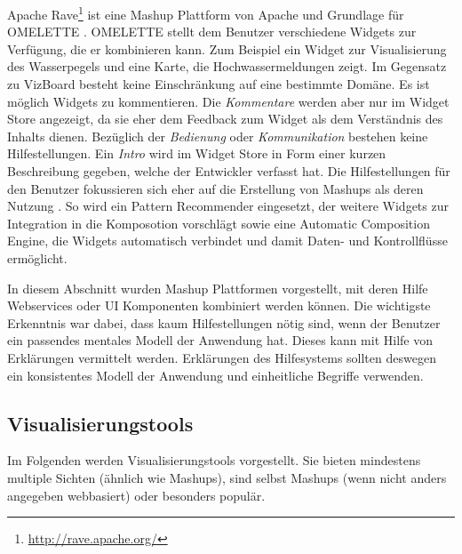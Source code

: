 \documentclass[
	headsepline,
	footsepline,
	fontsize=12pt,
	bibliography=totoc
]{scrbook}
\begin{document}
Apache Rave\footnote{\url{http://rave.apache.org/}} ist eine Mashup Plattform von Apache und Grundlage für OMELETTE \cite{Chudnovskyy2012}. OMELETTE stellt dem Benutzer verschiedene Widgets zur Verfügung, die er kombinieren kann. Zum Beispiel ein Widget zur Visualisierung des Wasserpegels und eine Karte, die Hochwassermeldungen zeigt. Im Gegensatz zu VizBoard besteht keine Einschränkung auf eine bestimmte Domäne. Es ist möglich Widgets zu kommentieren. Die \emph{Kommentare} werden aber nur im Widget Store angezeigt, da sie eher dem Feedback zum Widget als dem Verständnis des Inhalts dienen. Bezüglich der \emph{Bedienung} oder \emph{Kommunikation} bestehen keine Hilfestellungen. Ein \emph{Intro} wird im Widget Store in Form einer kurzen Beschreibung gegeben, welche der Entwickler verfasst hat. Die Hilfestellungen für den Benutzer fokussieren sich eher auf die Erstellung von Mashups als deren Nutzung \cite{Chowdhury2013}. So wird ein Pattern Recommender eingesetzt, der weitere Widgets zur Integration in die Komposotion vorschlägt sowie eine Automatic Composition Engine, die Widgets automatisch verbindet und damit Daten- und Kontrollflüsse ermöglicht.



In diesem Abschnitt wurden Mashup Plattformen vorgestellt, mit deren Hilfe Webservices oder UI Komponenten kombiniert werden können. Die wichtigste Erkenntnis war dabei, dass kaum Hilfestellungen nötig sind, wenn der Benutzer ein passendes mentales Modell der Anwendung hat. Dieses kann mit Hilfe von Erklärungen vermittelt werden. Erklärungen des Hilfesystems sollten deswegen ein konsistentes Modell der Anwendung und einheitliche Begriffe verwenden.

\subsection{Visualisierungstools}
\label{section:standderforschung:verwandte_arbeiten:visualisierungstools}

Im Folgenden werden Visualisierungstools vorgestellt. Sie bieten mindestens multiple Sichten (ähnlich wie Mashups), sind selbst Mashups (wenn nicht anders angegeben webbasiert) oder besonders populär.

\end{document}
